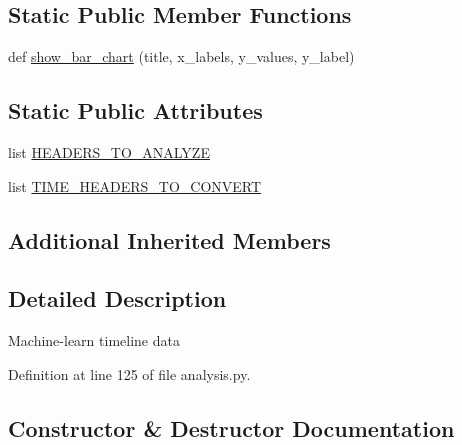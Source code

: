 \subsection*{Static Public Member Functions}
\begin{DoxyCompactItemize}
\item 
def \hyperlink{classpygce_1_1analysis_1_1_timeline_data_analysis_a06b3a75da7e10e4f57143d9fefe76f6c}{show\+\_\+bar\+\_\+chart} (title, x\+\_\+labels, y\+\_\+values, y\+\_\+label)
\end{DoxyCompactItemize}
\subsection*{Static Public Attributes}
\begin{DoxyCompactItemize}
\item 
list \hyperlink{classpygce_1_1analysis_1_1_timeline_data_analysis_a63947b48b5b29edd62e4ffd85933f56d}{H\+E\+A\+D\+E\+R\+S\+\_\+\+T\+O\+\_\+\+A\+N\+A\+L\+Y\+ZE}
\item 
list \hyperlink{classpygce_1_1analysis_1_1_timeline_data_analysis_a7e17c22c5a50f78e38fccf29174441f0}{T\+I\+M\+E\+\_\+\+H\+E\+A\+D\+E\+R\+S\+\_\+\+T\+O\+\_\+\+C\+O\+N\+V\+E\+RT}
\end{DoxyCompactItemize}
\subsection*{Additional Inherited Members}


\subsection{Detailed Description}
\begin{DoxyVerb}Machine-learn timeline data \end{DoxyVerb}
 

Definition at line 125 of file analysis.\+py.



\subsection{Constructor \& Destructor Documentation}
